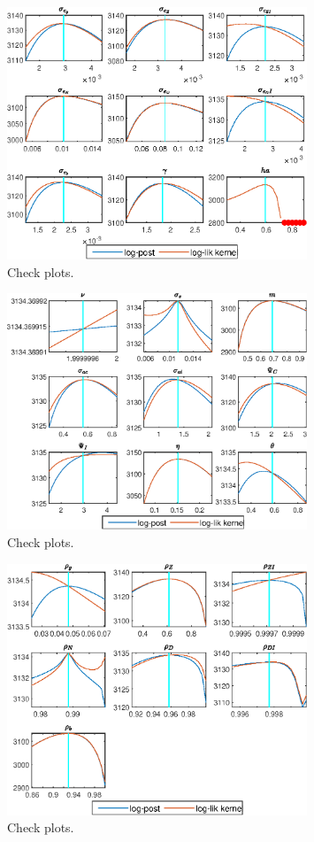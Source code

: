  
\begin{figure}[H]
\centering 
\includegraphics[width=0.80\textwidth]{BRS_gen/graphs/BRS_gen_CheckPlots1}
\caption{Check plots.}\label{Fig:CheckPlots:1}
\end{figure}
 
\begin{figure}[H]
\centering 
\includegraphics[width=0.80\textwidth]{BRS_gen/graphs/BRS_gen_CheckPlots2}
\caption{Check plots.}\label{Fig:CheckPlots:2}
\end{figure}
 
\begin{figure}[H]
\centering 
\includegraphics[width=0.80\textwidth]{BRS_gen/graphs/BRS_gen_CheckPlots3}
\caption{Check plots.}\label{Fig:CheckPlots:3}
\end{figure}
 
